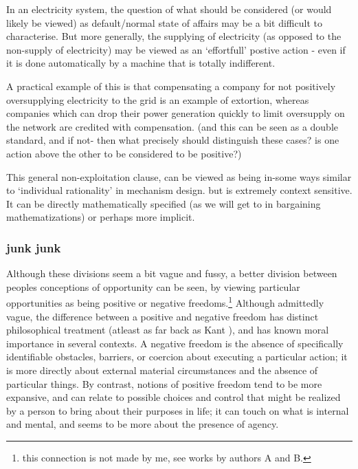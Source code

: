 In an electricity system, the question of what should be considered (or would likely be viewed) as default/normal state of affairs may be a bit difficult to characterise.
But more generally, the supplying of electricity (as opposed to the non-supply of electricity) may be viewed as an `effortfull' postive action - even if it is done automatically by a machine that is totally indifferent.

A practical example of this is that compensating a company for not positively oversupplying electricity to the grid is an example of extortion, whereas companies which can drop their power generation quickly to limit oversupply on the network are credited with compensation. (and this can be seen as a double standard, and if not- then what precisely should distinguish these cases? is one action above the other to be considered to be positive?)

This general non-exploitation clause, can be viewed as being in-some ways similar to `individual rationality' in mechanism design. but is extremely context sensitive.
It can be directly mathematically specified (as we will get to in bargaining mathematizations) or perhaps more implicit.




\subsubsection{junk junk}



Although these divisions seem a bit vague and fussy, a better division between peoples conceptions of opportunity can be seen, by viewing particular opportunities as being positive or negative freedoms.\footnote{this connection is not made by me, see works by authors A and B.}
Although admittedly vague, the difference between a positive and negative freedom has distinct philosophical treatment (atleast as far back as Kant \cite{}), and has known moral importance in several contexts.
A negative freedom is the absence of specifically identifiable obstacles, barriers, or coercion about executing a particular action; it is more directly about external material circumstances and the absence of particular things.
By contrast, notions of positive freedom tend to be more expansive, and can relate to possible choices and control that might be realized by a person to bring about their purposes in life; it can touch on what is internal and mental, and seems to be more about the presence of agency.

